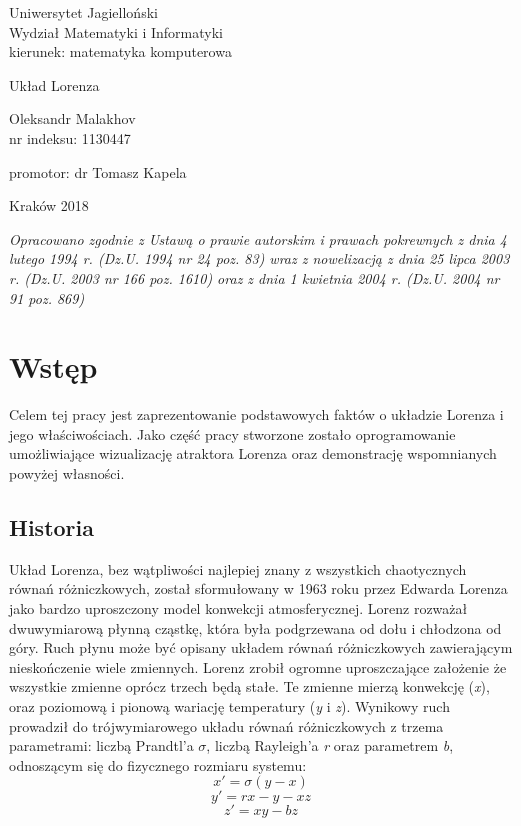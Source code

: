 \documentclass[12pt]{report}
\begin{document}
\begin{titlepage}
	\begin{center}
	\large 
	Uniwersytet Jagielloński\\
	Wydział Matematyki i Informatyki\\
	kierunek: matematyka komputerowa
	
	\vspace{5.0cm}
	\huge
	Układ Lorenza
	
	\vspace{1.0cm}
	\large
	Oleksandr Malakhov \\
	nr indeksu: 1130447
	\end{center}
	
	\vspace{3.0cm}
	\begin{flushright}
	promotor: dr Tomasz Kapela
	\end{flushright}
	
	\vspace{3.5cm}
	\begin{center}
		\footnotesize
		Kraków 2018
	\end{center}
	\tiny\textit{Opracowano zgodnie z Ustawą o prawie autorskim i prawach pokrewnych z dnia 4 lutego 1994 r. (Dz.U. 1994 nr 24 poz. 83) wraz z nowelizacją z dnia 25 lipca 2003 r. (Dz.U. 2003 nr 166 poz. 1610) oraz z dnia 1 kwietnia 2004 r. (Dz.U. 2004 nr 91 poz. 869)}
\end{titlepage}

\tableofcontents

\chapter{Wstęp}
	\par Celem tej pracy jest zaprezentowanie podstawowych faktów o układzie Lorenza i jego właściwościach. Jako część pracy stworzone zostało oprogramowanie umożliwiające wizualizację atraktora Lorenza oraz demonstrację wspomnianych powyżej własności.

	\section{Historia}
	\par Układ Lorenza, bez wątpliwości najlepiej znany z wszystkich chaotycznych równań różniczkowych, został sformułowany w 1963 roku przez Edwarda Lorenza jako bardzo uproszczony model konwekcji atmosferycznej. Lorenz rozważał dwuwymiarową płynną cząstkę, która była podgrzewana od dołu i chłodzona od góry. Ruch płynu może być opisany układem równań różniczkowych zawierającym nieskończenie wiele zmiennych. Lorenz zrobił ogromne uproszczające założenie że wszystkie zmienne oprócz trzech będą stałe. Te zmienne mierzą konwekcję (\textit{x}), oraz poziomową i pionową wariację temperatury (\textit{y} i \textit{z}). Wynikowy ruch prowadził do trójwymiarowego układu równań różniczkowych z trzema parametrami: liczbą Prandtl'a $\sigma$, liczbą Rayleigh'a \textit{r} oraz parametrem \textit{b}, odnoszącym się do fizycznego rozmiaru systemu:
		\[ x' = \sigma (y - x) \]
		\[ y' = rx - y - xz \]
		\[ z' = xy - bz \]
\end{document}
